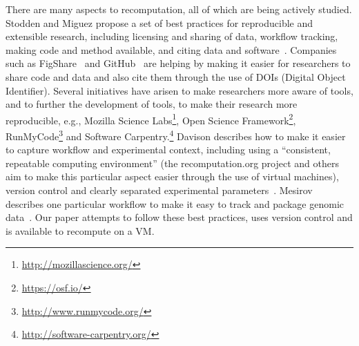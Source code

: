 There are many aspects to recomputation, all of which are being actively
studied. Stodden and Miguez propose a set of best practices for reproducible and
extensible research, including licensing and sharing of data, workflow tracking,
making code and method available, and citing data and
software~\cite{stodden:practices}. Companies such as
FigShare~\cite{figshare:citable} and GitHub~\cite{github:citable} are helping by
making it easier for researchers to share code and data and also cite them
through the use of DOIs (Digital Object Identifier). Several initiatives have
arisen to make researchers more aware of tools, and to further the development
of tools, to make their research more reproducible, e.g., Mozilla Science
Labs\footnote{\url{http://mozillascience.org/}}, Open Science
Framework\footnote{\url{https://osf.io/}},
RunMyCode\footnote{\url{http://www.runmycode.org/}} and Software
Carpentry.\footnote{\url{http://software-carpentry.org/}} Davison describes how
to make it easier to capture workflow and experimental context, including using
a ``consistent, repeatable computing environment'' (the recomputation.org
project and others~\cite{howe:reproducible} aim to make this particular aspect
easier through the use of virtual machines), version control and clearly
separated experimental parameters~\cite{davison:reproducibility}. Mesirov
describes one particular workflow to make it easy to track and package genomic
data~\cite{mesirov:accessible}. Our paper attempts to follow these best
practices, uses version control and is available to recompute on a VM.

%
%
